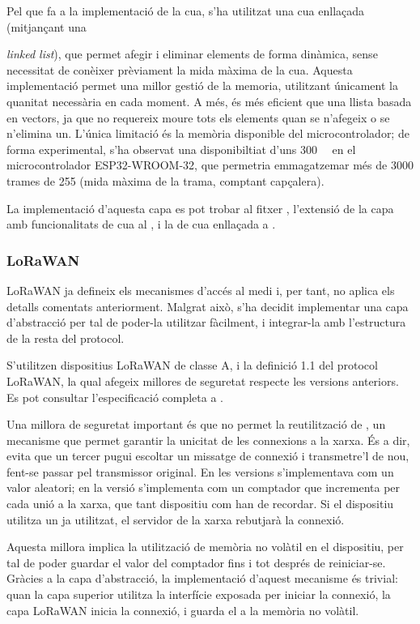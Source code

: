\documentclass{tfgitic}[2024/07/01]
\begin{document}
Pel que fa a la implementació de la cua, s'ha utilitzat una cua enllaçada (mitjançant una {\emph{linked list}), que permet afegir i eliminar elements de forma dinàmica, sense necessitat de conèixer prèviament la mida màxima de la cua. Aquesta implementació permet una millor gestió de la memoria, utilitzant únicament la quanitat necessària en cada moment. A més, és més eficient que una llista basada en vectors, ja que no requereix moure tots els elements quan se n'afegeix o se n'elimina un. L'única limitació és la memòria disponible del microcontrolador; de forma experimental, s'ha observat una disponibiltiat d'uns \SI{300}{\kilo\byte} en el microcontrolador ESP32-WROOM-32, que permetria emmagatzemar més de \num{3000} trames de \SI{255}{\byte} (mida màxima de la trama, comptant capçalera).

La implementació d'aquesta capa es pot trobar al fitxer , l'extensió de la capa amb funcionalitats de cua al , i la de cua enllaçada a .
\subsubsection{LoRaWAN}
\label{subsubsec:mac_lorawan}
LoRaWAN ja defineix els mecanismes d'accés al medi i, per tant, no aplica els detalls comentats anteriorment. Malgrat això, s'ha decidit implementar una capa d'abstracció per tal de poder-la utilitzar fàcilment, i integrar-la amb l'estructura de la resta del protocol.

S'utilitzen dispositius LoRaWAN de classe A, i la definició 1.1 del protocol LoRaWAN, la qual afegeix millores de seguretat respecte les versions  anteriors. Es pot consultar l'especificació completa a \cite{noauthor_lorawan_2023}.

Una millora de seguretat important és que no permet la reutilització de , un mecanisme que permet garantir la unicitat de les connexions a la xarxa. És a dir, evita que un tercer pugui escoltar un missatge de connexió i transmetre'l de nou, fent-se passar pel transmissor original. En les versions  s'implementava com un valor aleatori; en la versió  s'implementa com un comptador que incrementa per cada unió a la xarxa, que tant dispositiu com  han de recordar. Si el dispositiu utilitza un  ja utilitzat, el servidor de la xarxa rebutjarà la connexió. 

Aquesta millora implica la utilització de memòria no volàtil en el dispositiu, per tal de poder guardar el valor del comptador fins i tot després de reiniciar-se. Gràcies a la capa d'abstracció, la implementació d'aquest mecanisme és trivial: quan la capa superior utilitza la interfície exposada per iniciar la connexió, la capa LoRaWAN inicia la connexió, i guarda el  a la memòria no volàtil.

}
\end{document}
